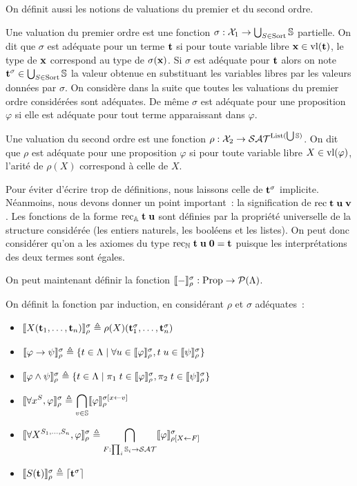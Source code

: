 \documentclass{article}
\begin{document}
On définit aussi les notions de valuations du premier et du second ordre.

\begin{defi}[Valuation]
  Une valuation du premier ordre est une fonction $\sigma : \mathcal X_1 \to \bigcup_{S \in \mathrm{Sort}}\mathbb{S}$ partielle. On dit que $\sigma$ est adéquate pour un terme $\mathbf{t}$ si pour toute variable libre $\mathbf{x}\in \mathrm{vl}(\mathbf{t})$, le type de $\mathbf{x}$ correspond au type de $\sigma(\mathbf{x})$. Si $\sigma$ est adéquate pour $\mathbf{t}$ alors on note $\mathbf{t}^\sigma \in \bigcup_{S\in\mathrm{Sort}}\mathbb{S}$ la valeur obtenue en substituant les variables libres par les valeurs données par $\sigma$. On considère dans la suite que toutes les valuations du premier ordre considérées sont adéquates. De même $\sigma$ est adéquate pour une proposition $\varphi$ si elle est adéquate pour tout terme apparaissant dans $\varphi$.

  Une valuation du second ordre est une fonction $\rho : \mathcal X_2\to \mathcal {SAT}^{\mathrm{List}(\bigcup \mathbb{S})}$. On dit que $\rho$ est adéquate pour une proposition $\varphi$ si pour toute variable libre $X\in\mathrm{vl}(\varphi)$, l'arité de $\rho(X)$ correspond à celle de $X$.
\end{defi}

\begin{rmk}
  Pour éviter d'écrire trop de définitions, nous laissons celle de $\mathbf{t}^\sigma$ implicite. Néanmoins, nous devons donner un point important~: la signification de $\mathrm{rec}\;\mathbf{t}\;\mathbf{u}\;\mathbf{v}$. Les fonctions de la forme $\mathrm{rec}_{\mathbb A}\;\mathbf{t}\;\mathbf{u}$ sont définies par la propriété universelle de la structure considérée (les entiers naturels, les booléens et les listes). On peut donc considérer qu'on a les axiomes du type $\mathrm{rec}_{\mathbb{N}}\;\mathbf{t}\;\mathbf{u}\;\boldsymbol 0 = \mathbf{t}$ puisque les interprétations des deux termes sont égales.
\end{rmk}

On peut maintenant définir la fonction $\llbracket - \rrbracket_\rho^\sigma : \mathrm{Prop} \to \mathcal P(\Lambda)$.

\begin{defi}[Interprétation]
  On définit la fonction par induction, en considérant $\rho$ et $\sigma$ adéquates~:
  \begin{itemize}
  \item $\llbracket X(\mathbf{t}_1,\ldots,\mathbf{t}_n) \rrbracket_\rho^\sigma \triangleq \rho(X)(\mathbf{t}_1^\sigma,\ldots,\mathbf{t}_n^\sigma)$
  \item $\llbracket \varphi\to\psi \rrbracket_\rho^\sigma\triangleq \{t\in\Lambda\mid \forall u \in \llbracket \varphi \rrbracket_\rho^\sigma, t\;u\in\llbracket \psi \rrbracket_\rho^\sigma\}$
  \item $\llbracket \varphi\land \psi \rrbracket_\rho^\sigma \triangleq \{t\in \Lambda\mid \pi_1\;t\in\llbracket \varphi \rrbracket_\rho^\sigma, \pi_2\;t\in\llbracket \psi \rrbracket_\rho^\sigma\}$
  \item $\displaystyle\llbracket \forall x^S, \varphi \rrbracket_\rho^\sigma \triangleq \bigcap_{v \in \mathbb{S}}\llbracket \varphi \rrbracket_\rho^{\sigma[x \leftarrow v]}$
  \item $\displaystyle\llbracket \forall X^{S_1,\ldots,S_n}, \varphi \rrbracket_\rho^\sigma\triangleq\bigcap_{F : \prod_i \mathbb{S}_i \to \mathcal {SAT}}\llbracket \varphi \rrbracket_{\rho[X \leftarrow F]}^\sigma$
  \item $\llbracket S(\mathbf{t}) \rrbracket_\rho^\sigma \triangleq \lceil \mathbf{t}^\sigma \rceil$
  \end{itemize}
\end{defi}
\end{document}
